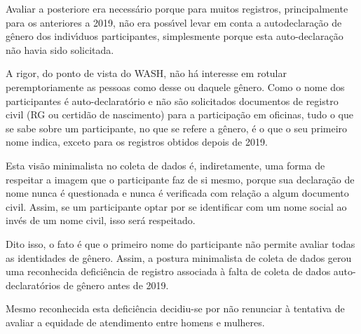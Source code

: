 \documentclass[
12pt,		%
openright,	%
twoside,  %
a4paper,			%
chapter=TITLE,		%
english,			%
french,				%
spanish,			%
brazil				%
]{USPSC-classe/USPSC}
\begin{document}
Avaliar a posteriore era necess\'ario porque para muitos registros, principalmente para os anteriores a 2019, n\~ao era poss\'{\i}vel levar em conta a autodeclara\c{c}\~ao de g\^enero dos indiv\'{\i}duos participantes, simplesmente porque esta auto-declara\c{c}\~ao n\~ao havia sido solicitada.









A rigor, do ponto de vista do WASH, n\~ao h\'a interesse em rotular peremptoriamente as pessoas como desse ou daquele g\^enero. Como o nome dos participantes \'e auto-declarat\'orio e n\~ao s\~ao solicitados documentos de registro civil (RG ou certid\~ao de nascimento) para a participa\c{c}\~ao em oficinas, tudo o que se sabe sobre um participante, no que se refere a g\^enero, \'e o que o seu primeiro nome indica, exceto para os registros obtidos depois de 2019.









Esta vis\~ao minimalista no coleta de dados \'e, indiretamente, uma forma de respeitar a imagem que o participante faz de si mesmo, porque sua declara\c{c}\~ao de nome nunca \'e questionada e nunca \'e verificada com rela\c{c}\~ao a algum documento civil. Assim, se um participante optar por se identificar com um nome social ao inv\'es de um nome civil, isso ser\'a respeitado.









Dito isso, o fato \'e que o primeiro nome do participante n\~ao permite avaliar todas as identidades de g\^enero. Assim, a postura minimalista de coleta de dados gerou uma reconhecida defici\^encia de registro associada \`a falta de coleta de dados auto-declarat\'orios de g\^enero antes de 2019.









Mesmo reconhecida esta defici\^encia decidiu-se por n\~ao renunciar \`a tentativa de avaliar a equidade de atendimento entre homens e mulheres.
\end{document}
